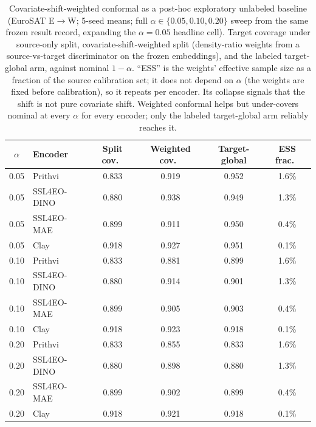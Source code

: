 \documentclass[journal]{IEEEtran}
\renewcommand{\_}{\textunderscore\allowbreak}
\begin{document}
\begin{table}[!t]\centering\small
\caption{Covariate-shift-weighted conformal \citep{tibshirani2019covariate} as a post-hoc exploratory
unlabeled baseline (EuroSAT E$\to$W; 5-seed means; full $\alpha\in\{0.05,0.10,0.20\}$ sweep from the same
frozen result record, expanding the $\alpha{=}0.05$ headline cell). Target coverage under source-only
split, covariate-shift-weighted split (density-ratio weights from a source-vs-target discriminator on the
frozen embeddings), and the labeled target-global arm, against nominal $1{-}\alpha$. ``ESS'' is the
weights' effective sample size as a fraction of the source calibration set; it does not depend on $\alpha$
(the weights are fixed before calibration), so it repeats per encoder. Its collapse signals that the shift
is not pure covariate shift. Weighted conformal helps but under-covers nominal at every $\alpha$ for every
encoder; only the labeled target-global arm reliably reaches it.}\label{tab:weighted}
\begin{tabular}{clcccc}
\toprule
$\alpha$ & Encoder & Split cov.\ & Weighted cov.\ & Target-global & ESS frac.\ \\
\midrule
0.05 & Prithvi     & 0.833 & 0.919 & 0.952 & 1.6\% \\
0.05 & SSL4EO-DINO & 0.880 & 0.938 & 0.949 & 1.3\% \\
0.05 & SSL4EO-MAE  & 0.899 & 0.911 & 0.950 & 0.4\% \\
0.05 & Clay        & 0.918 & 0.927 & 0.951 & 0.1\% \\
\midrule
0.10 & Prithvi     & 0.833 & 0.881 & 0.899 & 1.6\% \\
0.10 & SSL4EO-DINO & 0.880 & 0.914 & 0.901 & 1.3\% \\
0.10 & SSL4EO-MAE  & 0.899 & 0.905 & 0.903 & 0.4\% \\
0.10 & Clay        & 0.918 & 0.923 & 0.918 & 0.1\% \\
\midrule
0.20 & Prithvi     & 0.833 & 0.855 & 0.833 & 1.6\% \\
0.20 & SSL4EO-DINO & 0.880 & 0.898 & 0.880 & 1.3\% \\
0.20 & SSL4EO-MAE  & 0.899 & 0.902 & 0.899 & 0.4\% \\
0.20 & Clay        & 0.918 & 0.921 & 0.918 & 0.1\% \\
\bottomrule
\end{tabular}
\end{table}
\end{document}
